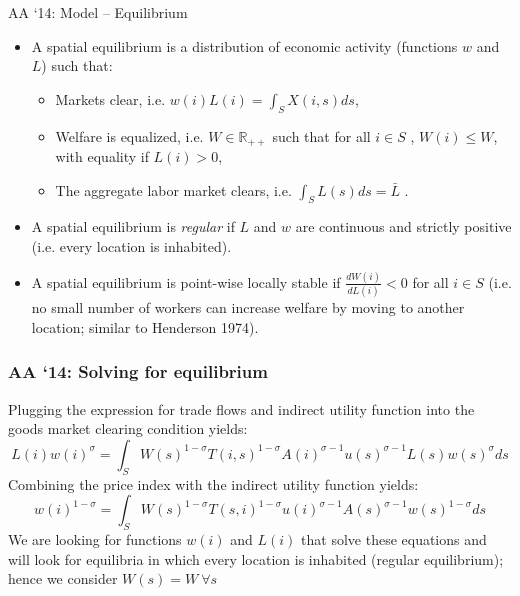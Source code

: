 \documentclass[11pt,notes=hide,aspectratio=169]{beamer}
\begin{document}
\begin{frame}{AA `14: Model -- Equilibrium}
\begin{itemize}
\item A spatial equilibrium is a distribution of economic activity (functions $w$ and $L$) such that:
\begin{itemize}
\item Markets clear, i.e. $w\left(i\right)L\left(i\right)=\int_{S}X\left(i,s\right)ds$, 
\item Welfare is equalized, i.e. $W\in\mathbb{R}_{++}$  such that for all $ i\in S$ , $W\left(i\right)\leq W$, with equality if $L\left(i\right)>0$, 
\item The aggregate labor market clears, i.e. $\int_{S}L\left(s\right)ds=\bar{L}$ . 
\end{itemize}
\medskip
\item A spatial equilibrium is \textit{regular} if $L$ and $w$ are continuous and strictly positive (i.e. every location is inhabited).\medskip
\item A spatial equilibrium is point-wise locally stable if $\frac{dW\left(i\right)}{dL\left(i\right)}<0$ for all $  i\in S$ (i.e. no small number of workers can increase welfare by moving to another location; similar to Henderson 1974).
\end{itemize}
\end{frame}
\begin{frame}
\frametitle{AA `14: Solving for equilibrium}
Plugging the expression for trade flows and indirect utility function into the goods market clearing condition yields:
\begin{equation*}
L(i)w(i)^{\sigma}=\int_{S} W(s)^{1-\sigma} T(i,s)^{1-\sigma}A(i)^{\sigma-1}u(s)^{\sigma-1}L(s)w(s)^{\sigma}ds 
\end{equation*}
Combining the price index with the indirect utility function yields:
\begin{equation*}
w(i)^{1-\sigma}=\int_{S} W(s)^{1-\sigma} T(s,i)^{1-\sigma}u\left(i\right)^{\sigma-1}A(s)^{\sigma-1}w(s)^{1-\sigma}ds 
\end{equation*}
We are looking for functions $w(i)$ and $ L(i)$ that solve these equations and will look for equilibria in which every location is inhabited (regular equilibrium); hence we consider $W(s) = W \ \forall s$
\end{frame}
\end{document}

